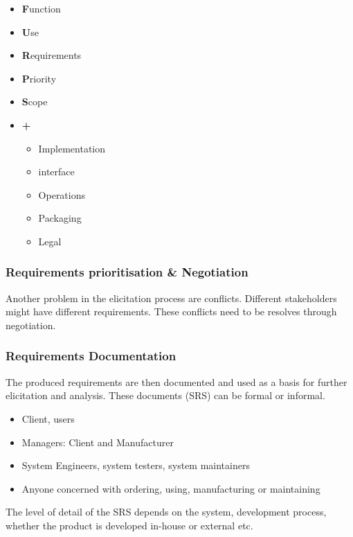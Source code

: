 \documentclass[
../../Software_Engineering_Summary.tex,
]
{subfiles}
\begin{document}
\begin{defbox*}
    \begin{itemize}
        \item \textbf{F}unction
        \item \textbf{U}se
        \item \textbf{R}equirements
        \item \textbf{P}riority
        \item \textbf{S}cope
        \item \textbf{+}
        \begin{itemize}
            \item Implementation
            \item interface
            \item Operations
            \item Packaging
            \item Legal
        \end{itemize}
    \end{itemize}
\end{defbox*}

\subsubsection{Requirements prioritisation \& Negotiation}
Another problem in the elicitation process are conflicts. Different stakeholders might have different requirements. These conflicts need to be resolves through negotiation.

\newpage
\subsubsection{Requirements Documentation}
The produced requirements are then documented and used as a basis for further elicitation and analysis. These documents (SRS) can be formal or informal.

\begin{defbox}
    \begin{itemize}
        \item Client, users
        \item Managers: Client and Manufacturer
        \item System Engineers, system testers, system maintainers
        \item Anyone concerned with ordering, using, manufacturing or maintaining
    \end{itemize}
    The level of detail of the SRS depends on the system, development process, whether the product is developed in-house or external etc.
\end{defbox}
\end{document}
